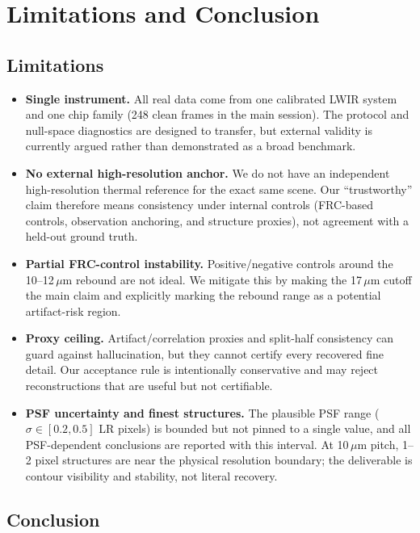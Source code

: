\section{Limitations and Conclusion}

\subsection{Limitations}

\begin{itemize}
\item \textbf{Single instrument.} All real data come from one calibrated LWIR
system and one chip family (248 clean frames in the main session). The protocol
and null-space diagnostics are designed to transfer, but external validity is
currently argued rather than demonstrated as a broad benchmark.

\item \textbf{No external high-resolution anchor.} We do not have an
independent high-resolution thermal reference for the exact same scene. Our
``trustworthy'' claim therefore means consistency under internal controls
(FRC-based controls, observation anchoring, and structure proxies), not
agreement with a held-out ground truth.

\item \textbf{Partial FRC-control instability.} Positive/negative controls around
the 10--12\,$\mu$m rebound are not ideal. We mitigate this by making the
17\,$\mu$m cutoff the main claim and explicitly marking the rebound range as a
potential artifact-risk region.

\item \textbf{Proxy ceiling.} Artifact/correlation proxies and split-half
consistency can guard against hallucination, but they cannot certify every
recovered fine detail. Our acceptance rule is intentionally conservative and may
reject reconstructions that are useful but not certifiable.

\item \textbf{PSF uncertainty and finest structures.} The plausible PSF range
($\sigma\in[0.2,0.5]$ LR pixels) is bounded but not pinned to a single value,
and all PSF-dependent conclusions are reported with this interval. At 10\,$\mu$m
pitch, 1--2 pixel structures are near the physical resolution boundary; the
deliverable is contour visibility and stability, not literal recovery.
\end{itemize}

\subsection{Conclusion}


